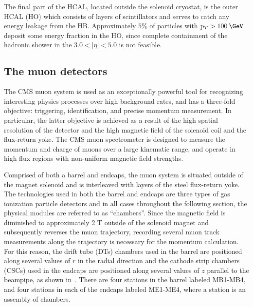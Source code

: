 The final part of the HCAL, located outside the solenoid cryostat, is the outer HCAL (HO) which consists of layers of scintillators and serves to catch any energy leakage from the HB. Approximately $5\%$ of particles with $\pt > 100\:\GeV$ deposit some energy fraction in the HO, since complete containment of the hadronic shower in the $3.0 < |\eta| < 5.0$ is not feasible.

\subsection{The muon detectors}
\label{subsec:muons}

The CMS muon system is used as an exceptionally powerful tool for recognizing interesting physics processes over high background rates, and has a three-fold objective: triggering, identification, and precise momentum measurement. In particular, the latter objective is achieved as a result of the high spatial resolution of the detector and the high magnetic field of the solenoid coil and the flux-return yoke. The CMS muon spectrometer is designed to measure the momentum and charge of muons over a large kinematic range, and operate in high flux regions with non-uniform magnetic field strengths.

Comprised of both a barrel and endcaps, the muon system is situated outside of the magnet solenoid and is interleaved with layers of the steel flux-return yoke. The technologies used in both the barrel and endcaps are three types of gas ionization particle detectors and in all cases throughout the following section, the physical modules are referred to as ``chambers''. Since the magnetic field is diminished to approximately 2 T outside of the solenoid magnet and subsequently reverses the muon trajectory, recording several muon track measurements along the trajectory is necessary for the momentum calculation. For this reason, the drift tube (DTs) chambers used in the barrel are positioned along several values of $r$ in the radial direction and the cathode strip chambers (CSCs) used in the endcaps are positioned along several values of $z$ parallel to the beampipe, as shown in~. There are four stations in the barrel labeled MB1-MB4, and four stations in each of the endcaps labeled ME1-ME4, where a station is an assembly of chambers.

